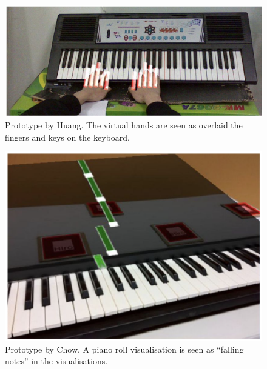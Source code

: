\documentclass[manuscript,screen]{acmart}
\begin{document}
\begin{figure}[h]
\centering
 \includegraphics[width=12cm]{figures/huang.png}
    \caption{Prototype by Huang. The virtual hands are seen as overlaid the fingers and keys on the keyboard.
    }\label{fig:huang}
\end{figure}
\begin{figure}[h]
\centering
 \includegraphics[width=12cm]{figures/chow.png}
    \caption{Prototype by Chow. A piano roll visualisation is seen as “falling notes” in the visualisations.
    }\label{fig:chow}
\end{figure}
\end{document}

